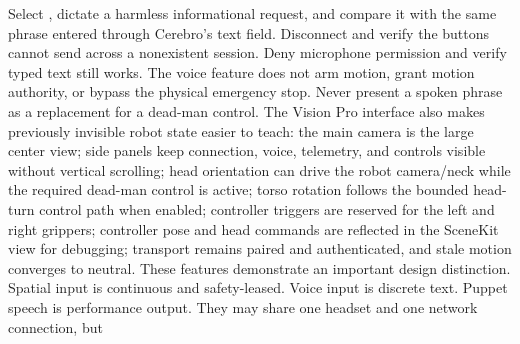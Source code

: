 Select , dictate a harmless informational request, and compare it\markdownRendererSoftLineBreak
{}with the same phrase entered through Cerebro's text field.\markdownRendererOlItemEnd 
{}Disconnect and verify the buttons cannot send across a nonexistent session.\markdownRendererOlItemEnd 
{}Deny microphone permission and verify typed text still works.\markdownRendererOlItemEnd 
\markdownRendererOlEnd \markdownRendererInterblockSeparator
{}The voice feature does not arm motion, grant motion authority, or bypass the\markdownRendererSoftLineBreak
{}physical emergency stop. Never present a spoken phrase as a replacement for a\markdownRendererSoftLineBreak
{}dead-man control.\markdownRendererInterblockSeparator
{}
\markdownRendererSectionEnd \markdownRendererSectionBegin
{}\markdownRendererInterblockSeparator
{}The Vision Pro interface also makes previously invisible robot state easier to\markdownRendererSoftLineBreak
{}teach:\markdownRendererInterblockSeparator
{}\markdownRendererUlBegin
\markdownRendererUlItem the main camera is the large center view;\markdownRendererUlItemEnd 
\markdownRendererUlItem side panels keep connection, voice, telemetry, and controls visible without\markdownRendererSoftLineBreak
{}vertical scrolling;\markdownRendererUlItemEnd 
\markdownRendererUlItem head orientation can drive the robot camera/neck while the required\markdownRendererSoftLineBreak
{}dead-man control is active;\markdownRendererUlItemEnd 
\markdownRendererUlItem torso rotation follows the bounded head-turn control path when enabled;\markdownRendererUlItemEnd 
\markdownRendererUlItem controller triggers are reserved for the left and right grippers;\markdownRendererUlItemEnd 
\markdownRendererUlItem controller pose and head commands are reflected in the SceneKit view for\markdownRendererSoftLineBreak
{}debugging;\markdownRendererUlItemEnd 
\markdownRendererUlItem transport remains paired and authenticated, and stale motion converges to\markdownRendererSoftLineBreak
{}neutral.\markdownRendererUlItemEnd 
\markdownRendererUlEnd \markdownRendererInterblockSeparator
{}These features demonstrate an important design distinction. Spatial input is\markdownRendererSoftLineBreak
{}continuous and safety-leased. Voice input is discrete text. Puppet speech is\markdownRendererSoftLineBreak
{}performance output. They may share one headset and one network connection, but\markdownRendererSoftLineBreak
